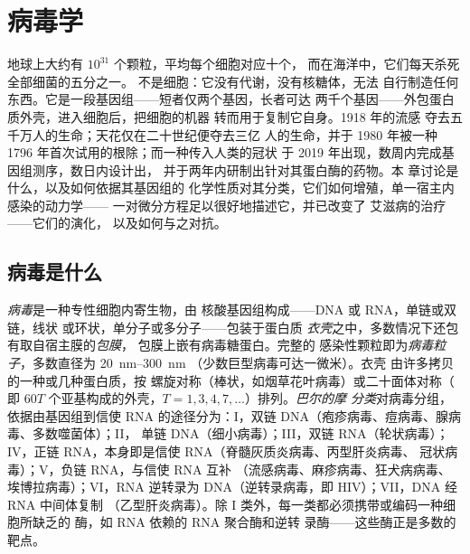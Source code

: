 \chapter{病毒学}\label{ch:b3:virology}

地球上大约有 $10^{31}$ 个颗粒，平均每个细胞对应十个，
而在海洋中，它们每天杀死全部细菌的五分之一。
不是细胞：它没有代谢，没有核糖体，无法
自行制造任何东西。它是一段基因组——短者仅两个基因，长者可达
两千个基因——外包蛋白质外壳，进入细胞后，把细胞的机器
转而用于复制它自身。1918 年的流感
夺去五千万人的生命；天花仅在二十世纪便夺去三亿
人的生命，并于 1980 年被一种
1796 年首次试用的根除；而一种传入人类的冠状
于 2019 年出现，数周内完成基因组测序，数日内设计出，
并于两年内研制出针对其蛋白酶的药物。本
章讨论是什么，以及如何依据其基因组的
化学性质对其分类，它们如何增殖，单一宿主内感染的动力学——
一对微分方程足以很好地描述它，并已改变了
艾滋病的治疗——它们的演化，
以及如何与之对抗。

\section{病毒是什么}

\begin{definition}[病毒]\label{def:b3:virology:virus}
\emph{病毒}是一种专性细胞内寄生物，由
核酸基因组构成——DNA 或 RNA，单链或双链，线状
或环状，单分子或多分子——包装于蛋白质
\emph{衣壳}之中，多数情况下还包有取自宿主膜的\emph{包膜}，
包膜上嵌有病毒糖蛋白。完整的
感染性颗粒即为\emph{病毒粒子}，多数直径为 \qtyrange{20}{300}{nm}
（少数巨型病毒可达一微米）。衣壳
由许多拷贝的一种或几种蛋白质，按
螺旋对称（棒状，如烟草花叶病毒）或二十面体对称（
即 $60T$ 个亚基构成的外壳，$T = 1, 3, 4, 7,\dots$）排列。\emph{巴尔的摩
分类}对病毒分组，依据由基因组到信使 RNA
的途径分为：I，双链 DNA（疱疹病毒、痘病毒、腺病毒、多数噬菌体）；II，
单链 DNA（细小病毒）；III，双链 RNA（轮状病毒）；
IV，正链 RNA，本身即是信使 RNA（脊髓灰质炎病毒、丙型肝炎病毒、
冠状病毒）；V，负链 RNA，与信使 RNA 互补
（流感病毒、麻疹病毒、狂犬病病毒、埃博拉病毒）；VI，RNA 逆转录为
DNA（逆转录病毒，即 HIV）；VII，DNA 经 RNA 中间体复制
（乙型肝炎病毒）。除 I 类外，每一类都必须携带或编码一种细胞所缺乏的
酶，如 RNA 依赖的 RNA 聚合酶和逆转
录酶——这些酶正是多数的靶点。
\end{definition}

